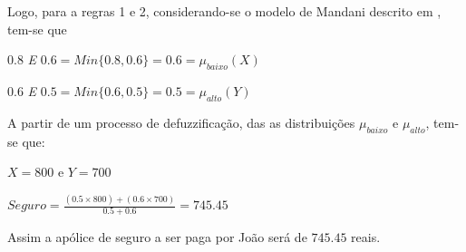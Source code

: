 Logo, para a regras 1 e 2, considerando-se o modelo de Mandani descrito em \cite{passos2005datamining}, tem-se que 
\begin{description}
  \item $0.8$ \emph{E} $0.6 = Min \lbrace 0.8,0.6 \rbrace = 0.6 = \mu_{baixo}(X)$ 
  \item $0.6$ \emph{E} $0.5 = Min \lbrace 0.6,0.5 \rbrace = 0.5 = \mu_{alto}(Y)$
\end{description}

A partir de um processo de defuzzificação, das as distribuições $\mu_{baixo}$
e $\mu_{alto}$, tem-se que:

\begin{description}
  \item $X = 800$ e $Y=700$
  \item $Seguro = \frac{(0.5 \times 800)+(0.6 \times 700)}{0.5 + 0.6} = 745.45$
\end{description}

Assim a apólice de seguro a ser paga por João será de $745.45$ reais.


